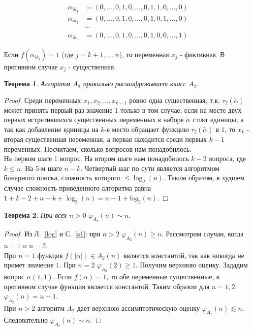 \documentclass[oneside, final, 14pt]{extreport}
\newtheorem{thm}{Теорема}
\begin{document}
	 \begin{displaymath}
	 \begin{aligned}
	 	\alpha_{ik_1} & = (0, \ldots,0, 1, 0, \ldots, 0, 1, 1, 0, \ldots, 0) \\
	 	\alpha_{ik_2} & = (0, \ldots,0, 1, 0, \ldots, 0, 1, 0, 1, \ldots, 0) \\
	 	                    & \cdots \\
	 	\alpha_{ik_n} & = (0, \ldots,0, 1, 0, \ldots, 0, 1, 0, 0, \ldots, 1)
	 \end{aligned}
	 \end{displaymath}	
	 
	Если $f(\alpha_{ik_j}) = 1$ (где $j = k+1, \ldots, n$), то переменная $x_j$ - фиктивная. В противном случае $x_j$ - существенная.	
	\begin{thm} 
		Алгоритм $A_2$ правильно расшифровывает класс $A_2$. 
	\end{thm}
	\begin{proof}
		Среди переменных $x_1, x_2, \ldots, x_{k-1}$ ровно одна существенная, т.к. $\tau_2(\tilde{\alpha})$ может принять первый раз значение $1$ только в 
		том случае, если на месте двух первых встретившихся существенных переменных в наборе $\tilde{\alpha}$ стоят единицы, 
		а так как добавление единицы на $k$-е место обращает функцию $\tau_2(\tilde{\alpha})$ в $1$, то $x_k$ -  вторая существенная переменная, 
		а первая находится среди первых $k-1$ переменных. 	Посчитаем, сколько вопросов нам понадобилось. \\
		На первом шаге 1 вопрос. На втором шаге нам понадобилось $k-2$ вопроса, где $k \leq n$. На 5-м шаге  $n-k$. Четвертый шаг по сути является
		алгоритмом бинарного поиска, сложность которого $ \leq \log_2(n)$. Таким образом, в худшем случае сложность приведенного алгоритма равна 
		$1 + k - 2 + n - k + \log_2(n) = n - 1 + log_2(n)$. 
	\end{proof} 	
	\begin{thm} 
		При всех $n > 0$ $\varphi_{A_2}(n) \sim n$.
	\end{thm}
	\begin{proof}
		Из Л.~\ref{log} и С.~\ref{s1}: при $n > 2$ $\varphi_{A_2}(n) \geq n$. Рассмотрим случаи, когда $n=1$ и $n=2$. \\
	    При $n = 1$ функция $f(|\alpha|) \in A_2(n)$ является константой, так как никогда не примет значение $1$. При $n=2$ $\varphi_{A_2}(2) \geq 1$. 
	    Получим верхнюю оценку. Зададим вопрос $\alpha(1, 1).$ Если $f(\alpha) = 1$, то обе переменные существенные, в противном случае функция является
	    константой. Таким образом для $n = 1,2$  $\varphi_{A_2}(n) = n-1$.\\
	    При $n > 2$ алгоритм $A_2$ дает верхнюю ассимптотическую  оценку $\varphi_{A_2}(n) \lesssim n$. Следовательно $\varphi_{A_2}(n) \sim n$.
	\end{proof}	
\end{document}
